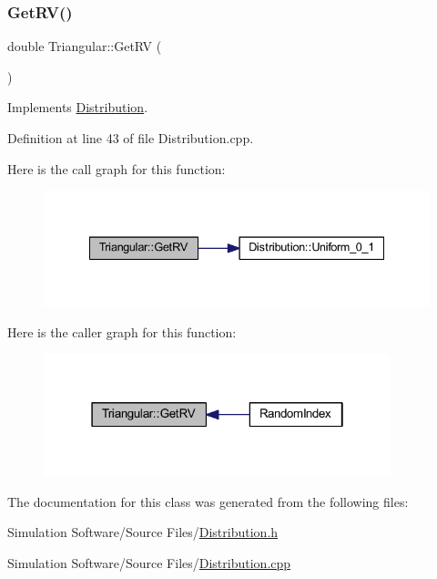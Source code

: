 \subsubsection{\texorpdfstring{Get\+R\+V()}{GetRV()}}
{\footnotesize\ttfamily double Triangular\+::\+Get\+RV (\begin{DoxyParamCaption}{ }\end{DoxyParamCaption})\hspace{0.3cm}{\ttfamily [virtual]}}



Implements \hyperlink{class_distribution_a63b433850d7b47d84eb69448f7916719}{Distribution}.



Definition at line 43 of file Distribution.\+cpp.

Here is the call graph for this function\+:\nopagebreak
\begin{figure}[H]
\begin{center}
\leavevmode
\includegraphics[width=335pt]{class_triangular_aadd53c452801be8c0eb6ffb31a299835_cgraph}
\end{center}
\end{figure}
Here is the caller graph for this function\+:\nopagebreak
\begin{figure}[H]
\begin{center}
\leavevmode
\includegraphics[width=286pt]{class_triangular_aadd53c452801be8c0eb6ffb31a299835_icgraph}
\end{center}
\end{figure}


The documentation for this class was generated from the following files\+:\begin{DoxyCompactItemize}
\item 
Simulation Software/\+Source Files/\hyperlink{_distribution_8h}{Distribution.\+h}\item 
Simulation Software/\+Source Files/\hyperlink{_distribution_8cpp}{Distribution.\+cpp}\end{DoxyCompactItemize}
